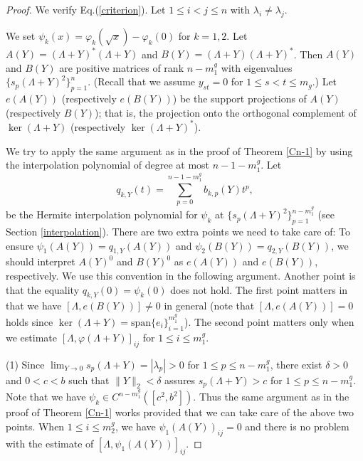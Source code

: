 \documentclass[12pt]{article}
\theoremstyle{definition}
\numberwithin{equation}{section}
\begin{document}
\begin{proof} We verify Eq.(\ref{criterion}). 
Let $1\leq i<j\leq n$ with $\lambda_i\neq \lambda_j$. 
	
We set $\psi_k(x)=\varphi_k(\sqrt{x})-\varphi_k(0)$ for $k=1,2$.   
Let $A(Y)=(\Lambda+Y)^*(\Lambda+Y)$ and $B(Y)=(\Lambda+Y)(\Lambda+Y)^*$. 
Then $A(Y)$ and $B(Y)$ are positive matrices of rank $n-m^g_1$ with eigenvalues $\{s_p(\Lambda+Y)^2\}_{p=1}^n$. 
(Recall that we assume $y_{st}=0$ for $1\leq s<t\leq m_g$.) 
Let $e(A(Y))$ (respectively $e(B(Y))$) be the support projections of $A(Y)$ (respectively $B(Y)$); 
that is, the projection onto the orthogonal complement of $\ker(\Lambda+Y)$ (respectively $\ker(\Lambda+Y)^*$). 

We try to apply the same argument as in the proof of Theorem \ref{Cn-1} by using the interpolation polynomial of degree 
at most $n-1-m^g_1$. 
Let 
\[q_{k,Y}(t)=\sum_{p=0}^{n-1-m^g_1}b_{k,p}(Y)t^p,\]
be the Hermite interpolation polynomial for $\psi_k$ at $\{s_p(\Lambda+Y)^2\}_{p=1}^{n-m^g_1}$ 
(see Section \ref{interpolation}).  
There are two extra points we need to take care of:   
To ensure $\psi_1(A(Y))=q_{1,Y}(A(Y))$ and $\psi_2(B(Y))=q_{2,Y}(B(Y))$, 
we should interpret $A(Y)^0$ and $B(Y)^0$ as $e(A(Y))$ and $e(B(Y))$, respectively. 
We use this convention in the following argument. 
Another point is that the equality $q_{k,Y}(0)=\psi_k(0)$ does not hold.  
The first point matters in that we have $[\Lambda,e(B(Y))]\neq 0$ in general  
(note that $[\Lambda,e(A(Y))]=0$ holds since $\ker (\Lambda+Y)=\mathrm{span}\{e_i\}_{i=1}^{m^g_1}$). 
The second point matters only when we estimate $[\Lambda,\varphi(\Lambda+Y)]_{ij}$ for $1\leq i\leq m^g_1$. 

(1) Since $\lim_{Y\to 0}s_p(\Lambda+Y)=|\lambda_p|>0$ for $1\leq p\leq n-m^g_1$, there exist $\delta>0$ and $0<c<b$ such that 
$\|Y\|_2<\delta$ assures $s_p(\Lambda+Y)>c$ for $1\leq p\leq n-m^g_1$. 
Note that we have $\psi_k\in C^{n-m^g_1}([c^2,b^2])$. 
Thus the same argument as in the proof of Theorem \ref{Cn-1} works provided that we can take care of the above two points. 
When $1\leq i\leq m^g_2$, we have $\psi_1(A(Y))_{ij}=0$ and there is no problem with the estimate of 
$[\Lambda,\psi_1(A(Y))]_{ij}$. 


\end{proof}
\end{document}

